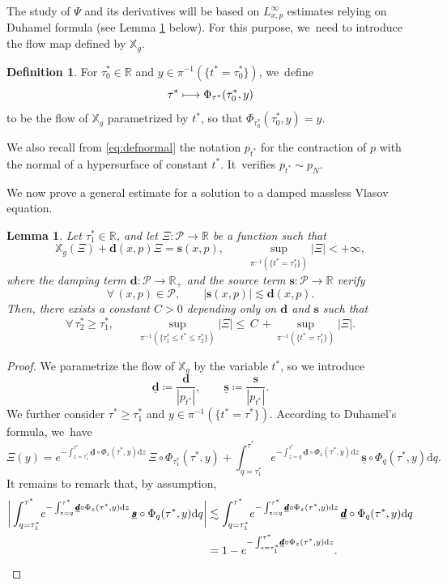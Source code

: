 \documentclass[10pt]{amsart}
\newcommand\mto{\mathchoice{\longmapsto}{\mapsto}{\mapsto}{\mapsto}}
\theoremstyle{plain}
\newtheorem{lemma}[proposition]{Lemma}
\theoremstyle{definition}
\newtheorem{definition}[proposition]{Definition}
\newcommand\R{{\mathbb{R}}}
\newcommand\T{{\mathbb{X}}}
\newcommand\dr{{\mathrm{d}}}
\begin{document}
The study of $\Psi$ and its derivatives will be based on $L^\infty_{x,p}$ estimates relying on Duhamel formula (see Lemma \ref{LemDuhamel} below). For this purpose, we~need to introduce the flow map defined by $\T_g$.
\begin{definition}
For $\tau^*_0\in \R$ and $y \in \pi^{-1}(\{t^*=\tau_0^* \})$, we~define
\[
\tau^* \mto \Phi_{\tau^*} (\tau_0^*,y)
\]
to be the flow of $\T_g$ parametrized by $t^*$, so that $\Phi_{\tau_0^*}(\tau_0^*,y)=y$.
\end{definition}
We also recall from \eqref{eq:defnormal} the notation $p_{t^*}$ for the contraction of $p$ with the normal of a hypersurface of constant $t^*$. It~verifies $p_{t^*} \sim p_N$.

We now prove a general estimate for a solution to a damped massless Vlasov equation.

\begin{lemma}\label{LemDuhamel}
Let $\tau_1^* \in \R$, and let $\Xi \colon \mathcal{P} \to \R$ be a function such that
\[
\T_g (\Xi)+ \pmb{d}(x,p) \Xi=\pmb{s}(x,p),\qquad \sup_{ \pi^{-1}(\{ t^* = \tau_1^* \}) }\big| \Xi \big| <+\infty,
\]
where the damping term $\pmb{d} \colon \mathcal{P} \to \R_+$ and the source term $\pmb{s} \colon \mathcal{P} \to \R$ verify
\[
\forall \, (x,p) \in \mathcal{P}, \qquad \big|\pmb{s} (x,p) \big| \lesssim \pmb{d}(x,p).
\]
Then, there exists a constant $C>0$ depending only on $\pmb{d}$ and $\pmb{s}$ such that
\[
\forall \, \tau_2^* \geq \tau_1^*,\qquad \sup_{\pi^{-1} (\{\tau_1^* \leq t^* \leq \tau_2^* \})} \big| \Xi \big| \leq \,C \,+\sup_{ \pi^{-1}(\{ t^* = \tau_1^* \}) }\big| \Xi \big|.
\]
\end{lemma}

\begin{proof}
We parametrize the flow of $\T_g$ by the variable $t^*$, so we introduce
\[
\underline{\pmb{d}} \coloneqq \frac{\pmb{d}}{|p_{t^*}|},\qquad \underline{\pmb{s}} \coloneqq \frac{\pmb{s}}{|p_{t^*}|}.
\]
We further consider $\tau^* \geq \tau_1^*$ and $y \in \pi^{-1}(\{t^*=\tau^* \})$. According to Duhamel's formula, we~have
\[
\Xi (y) = e^{-\int_{z=\tau_1^*}^{\tau^*} \underline{\pmb{d}} \circ \Phi_z(\tau^*,y) \dr z} \, \Xi \circ \Phi_{\tau_1^*}(\tau^*,y)+ \int_{q=\tau_1^*}^{\tau^*} e^{-\int_{z=q}^{\tau^*} \underline{\pmb{d}} \circ \Phi_z(\tau^*,y) \dr z} \, \underline{\pmb{s}} \circ \Phi_{q}(\tau^*,y) \dr q.
\]
It remains to remark that, by assumption,
\begin{align*}
\bigg|\int_{q=\tau_1^*}^{\tau^*} \! e^{-\int_{z=q}^{\tau^*} \underline{\pmb{d}} \circ \Phi_z(\tau^*,y) \dr z} \, \underline{\pmb{s}} \circ \Phi_{q}(\tau^*,y) \dr q \bigg| & \lesssim \int_{q=\tau_1^*}^{\tau^*} \! e^{-\int_{z=q}^{\tau^*} \underline{\pmb{d}} \circ \Phi_z(\tau^*,y) \dr z} \, \underline{\pmb{d}} \circ \Phi_{q}(\tau^*,y) \dr q \\
& =1- e^{-\int_{z=\tau_1^*}^{\tau^*} \! \underline{\pmb{d}} \circ \Phi_z(\tau^*,y) \dr z}. \qedhere
\end{align*}
\end{proof}
\end{document}
